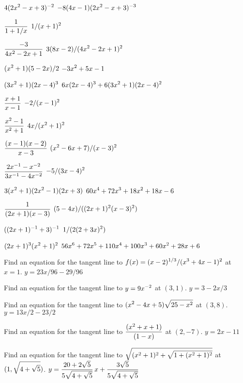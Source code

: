 \exercise $\displaystyle 4(2x^2-x+3)^{-2}$
\answer $\displaystyle -8(4x-1)(2x^2-x+3)^{-3}$
\endanswer
\endexercise

\exercise $\displaystyle {1\over 1+1/x}$
\answer $\displaystyle 1/(x+1)^2$
\endanswer
\endexercise

\exercise $\displaystyle {-3\over 4x^2-2x+1}$
\answer $\displaystyle 3(8x-2)/(4x^2-2x+1)^2$
\endanswer
\endexercise

\exercise $\displaystyle (x^2+1)(5-2x)/2$
\answer $\displaystyle -3x^2+5x-1$
\endanswer
\endexercise

\exercise $\displaystyle (3x^2+1)(2x-4)^3$
\answer $\displaystyle 6x(2x-4)^3+6(3x^2+1)(2x-4)^2$
\endanswer
\endexercise

\exercise $\displaystyle{x+1\over x-1}$
\answer $\displaystyle -2/(x-1)^2$
\endanswer
\endexercise

\exercise $\displaystyle{x^2-1\over x^2+1}$
\answer $\displaystyle 4x/(x^2+1)^2$
\endanswer
\endexercise

\exercise $\displaystyle{(x-1)(x-2)\over x-3}$
\answer $\displaystyle (x^2-6x+7)/(x-3)^2$
\endanswer
\endexercise

\exercise $\displaystyle{2x^{-1}-x^{-2}\over 3x^{-1}-4x^{-2}}$
\answer $\displaystyle -5/(3x-4)^2$
\endanswer
\endexercise

\exercise $\displaystyle 3(x^2+1)(2x^2-1)(2x+3)$
\answer $\displaystyle 60x^4+72x^3+18x^2+18x-6$
\endanswer
\endexercise

\exercise $\displaystyle{1\over (2x+1)(x-3)}$
\answer $\displaystyle (5-4x)/((2x+1)^2(x-3)^2)$
\endanswer
\endexercise

\exercise $\displaystyle ((2x+1)^{-1}+3)^{-1}$
\answer $\displaystyle 1/(2(2+3x)^2)$
\endanswer
\endexercise

\exercise $\displaystyle (2x+1)^3(x^2+1)^2$
\answer $\displaystyle 56x^6+72x^5+110x^4+100x^3+60x^2+28x+6$
\endanswer

\endtwocol
\bsk
\endexercise

\exercise  Find an equation for the tangent line to 
$\displaystyle f(x) = (x-2)^{1/3}/(x^3 + 4x - 1)^2$ at $x=1$.
\answer $y=23x/96-29/96$
\endanswer
\endexercise

\exercise Find an equation for the tangent line to $\displaystyle y=9x^{-2}$ at $(3,1)$.
\answer $y=3-2x/3$
\endanswer
\endexercise

\exercise Find an equation for the tangent line to $\displaystyle (x^2-4x+5)\sqrt{25-x^2}$ 
at $(3,8)$.
\answer $y=13x/2-23/2$
\endanswer
\endexercise

\exercise Find an equation for the tangent line to $\displaystyle \displaystyle{(x^2+x+1)\over(1-x)}$ 
at $(2,-7)$.
\answer $y=2x-11$
\endanswer
\endexercise

\exercise Find an equation for the tangent line to 
$\displaystyle \sqrt{(x^2+1)^2+\sqrt{1+(x^2+1)^2}}$
at $\displaystyle (1,\sqrt{4+\sqrt{5}})$.
\answer $\displaystyle y=
{20+2\sqrt5\over5\sqrt{4+\sqrt5}}\,x+{3\sqrt5\over5\sqrt{4+\sqrt5}}$
\endanswer
\endexercise

\endexercises
